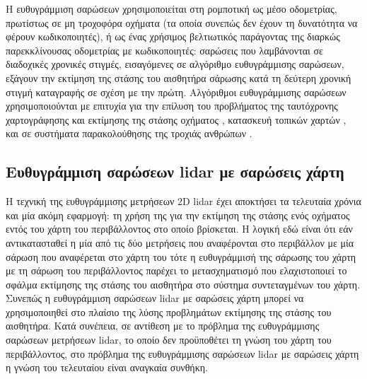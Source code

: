 \begin{gg_box}
\begin{remark}
\label{rem:sm_applications}
Η ευθυγράμμιση σαρώσεων χρησιμοποιείται στη ρομποτική ως μέσο οδομετρίας,
πρωτίστως σε μη τροχοφόρα οχήματα (τα οποία συνεπώς δεν έχουν τη δυνατότητα να
φέρουν κωδικοποιητές), ή ως ένας χρήσιμος βελτιωτικός παράγοντας της διαρκώς
παρεκκλίνουσας οδομετρίας με κωδικοποιητές: σαρώσεις που λαμβάνονται σε
διαδοχικές χρονικές στιγμές, εισαγόμενες σε αλγόριθμο ευθυγράμμισης
σαρώσεων, εξάγουν την εκτίμηση της στάσης του αισθητήρα σάρωσης κατά τη
δεύτερη χρονική στιγμή καταγραφής σε σχέση με την πρώτη. Αλγόριθμοι
ευθυγράμμισης σαρώσεων χρησιμοποιούνται με επιτυχία για την επίλυση του
προβλήματος της ταυτόχρονης χαρτογράφησης και εκτίμησης της στάσης οχήματος
\cite{Gutmann,Hahnel,Chieh-ChihWang}, κατασκευή τοπικών χαρτών
\cite{Lacroix2002a,Minguez,Montesano2008a}, και σε συστήματα παρακολούθησης της
τροχιάς ανθρώπων \cite{Schulz}.
\end{remark}
\end{gg_box}



\subsection{Ευθυγράμμιση σαρώσεων lidar με σαρώσεις χάρτη}
\label{subsec:01_01_02_6}

Η τεχνική της ευθυγράμμισης μετρήσεων 2D lidar έχει αποκτήσει τα τελευταία
χρόνια και μία ακόμη εφαρμογή: τη χρήση της για την εκτίμηση της στάσης ενός
οχήματος εντός του χάρτη του περιβάλλοντος στο οποίο βρίσκεται. Η λογική εδώ
είναι ότι εάν αντικατασταθεί η μία από τις δύο μετρήσεις που αναφέρονται στο
περιβάλλον με μία σάρωση που αναφέρεται στο χάρτη του τότε η ευθυγράμμισή
της σάρωσης του χάρτη με τη σάρωση του περιβάλλοντος παρέχει το μετασχηματισμό
που ελαχιστοποιεί το σφάλμα εκτίμησης της στάσης του αισθητήρα στο σύστημα
συντεταγμένων του χάρτη. Συνεπώς η ευθυγράμμιση σαρώσεων lidar με σαρώσεις
χάρτη μπορεί να χρησιμοποιηθεί στο πλαίσιο της λύσης προβλημάτων εκτίμησης της
στάσης του αισθητήρα. Κατά συνέπεια, σε αντίθεση με το πρόβλημα της
ευθυγράμμισης σαρώσεων μετρήσεων lidar, το οποίο δεν προϋποθέτει τη γνώση του
χάρτη του περιβάλλοντος, στο πρόβλημα της ευθυγράμμισης σαρώσεων lidar με
σαρώσεις χάρτη η γνώση του τελευταίου είναι αναγκαία συνθήκη.


